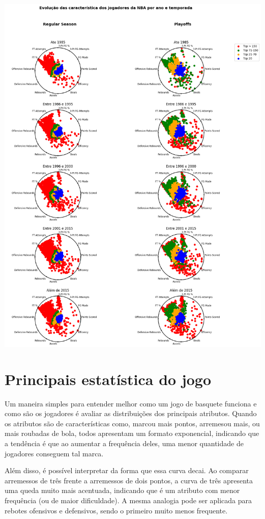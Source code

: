 \documentclass[
]{book}
\begin{document}
\includegraphics{imagens/14.png}

\hypertarget{principais-estatuxedstica-do-jogo}{%
\chapter{Principais estatística do jogo}\label{principais-estatuxedstica-do-jogo}}

Um maneira simples para entender melhor como um jogo de basquete funciona e como são os jogadores é avaliar as distribuições dos principais atributos. Quando os atributos são de características como, marcou mais pontos, arremesou mais, ou mais roubadas de bola, todos apresentam um formato exponencial, indicando que a tendência é que ao aumentar a frequência deles, uma menor quantidade de jogadores conseguem tal marca.

Além disso, é possível interpretar da forma que essa curva decai. Ao comparar arremessos de três frente a arremessos de dois pontos, a curva de três apresenta uma queda muito mais acentuada, indicando que é um atributo com menor frequência (ou de maior dificuldade). A mesma analogia pode ser aplicada para rebotes ofensivos e defensivos, sendo o primeiro muito menos frequente.
\end{document}
